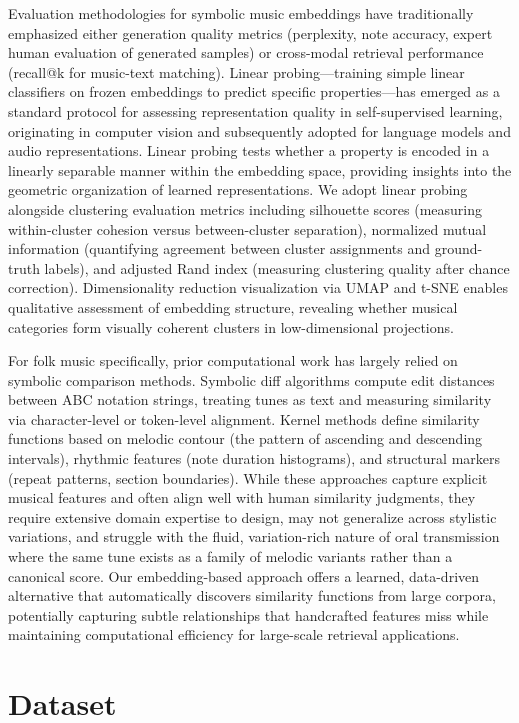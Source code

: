 \documentclass[]{interact}
\theoremstyle{plain}
\theoremstyle{definition}
\theoremstyle{remark}
\begin{document}
Evaluation methodologies for symbolic music embeddings have traditionally emphasized either generation quality metrics (perplexity, note accuracy, expert human evaluation of generated samples) or cross-modal retrieval performance (recall@k for music-text matching). Linear probing—training simple linear classifiers on frozen embeddings to predict specific properties—has emerged as a standard protocol for assessing representation quality in self-supervised learning, originating in computer vision and subsequently adopted for language models and audio representations. Linear probing tests whether a property is encoded in a linearly separable manner within the embedding space, providing insights into the geometric organization of learned representations. We adopt linear probing alongside clustering evaluation metrics including silhouette scores (measuring within-cluster cohesion versus between-cluster separation), normalized mutual information (quantifying agreement between cluster assignments and ground-truth labels), and adjusted Rand index (measuring clustering quality after chance correction). Dimensionality reduction visualization via UMAP and t-SNE enables qualitative assessment of embedding structure, revealing whether musical categories form visually coherent clusters in low-dimensional projections.

For folk music specifically, prior computational work has largely relied on symbolic comparison methods. Symbolic diff algorithms compute edit distances between ABC notation strings, treating tunes as text and measuring similarity via character-level or token-level alignment. Kernel methods define similarity functions based on melodic contour (the pattern of ascending and descending intervals), rhythmic features (note duration histograms), and structural markers (repeat patterns, section boundaries). While these approaches capture explicit musical features and often align well with human similarity judgments, they require extensive domain expertise to design, may not generalize across stylistic variations, and struggle with the fluid, variation-rich nature of oral transmission where the same tune exists as a family of melodic variants rather than a canonical score. Our embedding-based approach offers a learned, data-driven alternative that automatically discovers similarity functions from large corpora, potentially capturing subtle relationships that handcrafted features miss while maintaining computational efficiency for large-scale retrieval applications.

\section{Dataset}\label{sec:dataset}
\end{document}
